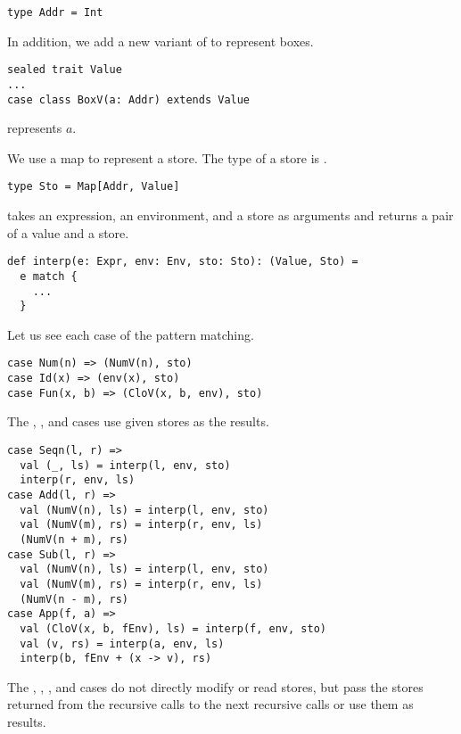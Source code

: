 \begin{verbatim}
type Addr = Int
\end{verbatim}

In addition, we add a new variant of  to represent boxes.

\begin{verbatim}
sealed trait Value
...
case class BoxV(a: Addr) extends Value
\end{verbatim}

 represents $a$.

We use a map to represent a store. The type of a store is .

\begin{verbatim}
type Sto = Map[Addr, Value]
\end{verbatim}

 takes an expression, an environment, and a store as arguments and
returns a pair of a value and a store.

\begin{verbatim}
def interp(e: Expr, env: Env, sto: Sto): (Value, Sto) =
  e match {
    ...
  }
\end{verbatim}

Let us see each case of the pattern matching.

\begin{verbatim}
case Num(n) => (NumV(n), sto)
case Id(x) => (env(x), sto)
case Fun(x, b) => (CloV(x, b, env), sto)
\end{verbatim}

The , , and  cases use given stores as the results.

\begin{verbatim}
case Seqn(l, r) =>
  val (_, ls) = interp(l, env, sto)
  interp(r, env, ls)
case Add(l, r) =>
  val (NumV(n), ls) = interp(l, env, sto)
  val (NumV(m), rs) = interp(r, env, ls)
  (NumV(n + m), rs)
case Sub(l, r) =>
  val (NumV(n), ls) = interp(l, env, sto)
  val (NumV(m), rs) = interp(r, env, ls)
  (NumV(n - m), rs)
case App(f, a) =>
  val (CloV(x, b, fEnv), ls) = interp(f, env, sto)
  val (v, rs) = interp(a, env, ls)
  interp(b, fEnv + (x -> v), rs)
\end{verbatim}

The , , , and  cases do not directly
modify or read stores, but pass the stores returned from the recursive calls to the
next recursive calls or use them as results.

